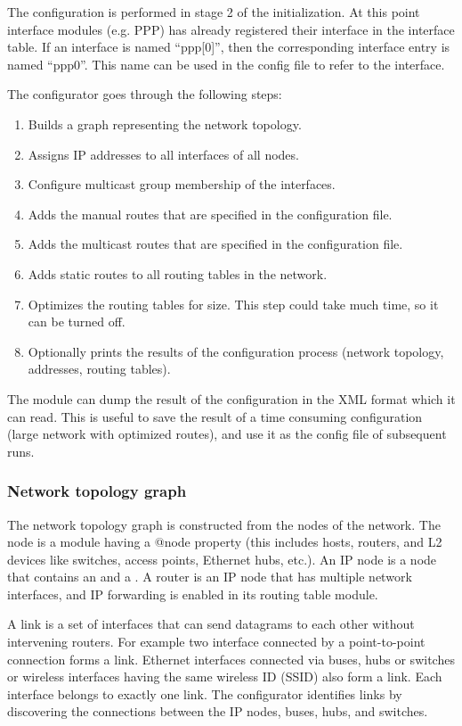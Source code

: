 The configuration is performed in stage 2 of the initialization. At this
point interface modules (e.g. PPP) has already registered their interface
in the interface table. If an interface is named ``ppp[0]'', then the
corresponding interface entry is named ``ppp0''. This name can be used
in the config file to refer to the interface.

The configurator goes through the following steps:
\begin{enumerate}
  \item Builds a graph representing the network topology.
  \item Assigns IP addresses to all interfaces of all nodes.
  \item Configure multicast group membership of the interfaces.
  \item Adds the manual routes that are specified in the configuration file.
  \item Adds the multicast routes that are specified in the configuration file.
  \item Adds static routes to all routing tables in the network.
  \item Optimizes the routing tables for size. This step could take
        much time, so it can be turned off.
  \item Optionally prints the results of the configuration process
        (network topology, addresses, routing tables).
\end{enumerate}

The module can dump the result of the configuration in the XML format
which it can read. This is useful to save the result of a time consuming
configuration (large network with optimized routes), and use it as
the config file of subsequent runs.

\subsubsection*{Network topology graph}

The network topology graph is constructed from the nodes
of the network. The node is a module having a @node property
(this includes hosts, routers, and L2 devices like switches,
 access points, Ethernet hubs, etc.). An IP node is a node
that contains an  and a .
A router is an IP node that has multiple network interfaces,
and IP forwarding is enabled in its routing table module.

A link is a set of interfaces that can send datagrams to each other
without intervening routers. For example two interface connected
by a point-to-point connection forms a link. Ethernet interfaces
connected via buses, hubs or switches or wireless interfaces
having the same wireless ID (SSID) also form a link.
 Each interface belongs to exactly
one link. The configurator identifies links by discovering
the connections between the IP nodes, buses, hubs, and switches.

